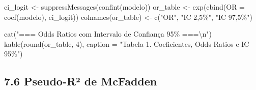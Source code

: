 \documentclass[
  letterpaper,
  DIV=11,
  numbers=noendperiod]{scrartcl}
\newenvironment{Shaded}{\begin{snugshade}}{\end{snugshade}}
\newcommand{\AttributeTok}[1]{\textcolor[rgb]{0.40,0.45,0.13}{#1}}
\newcommand{\DecValTok}[1]{\textcolor[rgb]{0.68,0.00,0.00}{#1}}
\newcommand{\FunctionTok}[1]{\textcolor[rgb]{0.28,0.35,0.67}{#1}}
\newcommand{\NormalTok}[1]{\textcolor[rgb]{0.00,0.23,0.31}{#1}}
\newcommand{\OtherTok}[1]{\textcolor[rgb]{0.00,0.23,0.31}{#1}}
\newcommand{\SpecialCharTok}[1]{\textcolor[rgb]{0.37,0.37,0.37}{#1}}
\newcommand{\StringTok}[1]{\textcolor[rgb]{0.13,0.47,0.30}{#1}}
\begin{document}
\begin{Shaded}
\begin{Highlighting}[]
\NormalTok{ci\_logit  }\OtherTok{\textless{}{-}} \FunctionTok{suppressMessages}\NormalTok{(}\FunctionTok{confint}\NormalTok{(modelo))}
\NormalTok{or\_table  }\OtherTok{\textless{}{-}} \FunctionTok{exp}\NormalTok{(}\FunctionTok{cbind}\NormalTok{(}\AttributeTok{OR =} \FunctionTok{coef}\NormalTok{(modelo), ci\_logit))}
\FunctionTok{colnames}\NormalTok{(or\_table) }\OtherTok{\textless{}{-}} \FunctionTok{c}\NormalTok{(}\StringTok{"OR"}\NormalTok{, }\StringTok{"IC 2,5\%"}\NormalTok{, }\StringTok{"IC 97,5\%"}\NormalTok{)}

\FunctionTok{cat}\NormalTok{(}\StringTok{"=== Odds Ratios com Intervalo de Confiança 95\% ===}\SpecialCharTok{\textbackslash{}n}\StringTok{"}\NormalTok{)}
\FunctionTok{kable}\NormalTok{(}\FunctionTok{round}\NormalTok{(or\_table, }\DecValTok{4}\NormalTok{),}
      \AttributeTok{caption =} \StringTok{"Tabela 1. Coeficientes, Odds Ratios e IC 95\%"}\NormalTok{)}
\end{Highlighting}
\end{Shaded}

\subsection{7.6 Pseudo-R² de McFadden}\label{pseudo-ruxb2-de-mcfadden-1}
\end{document}
